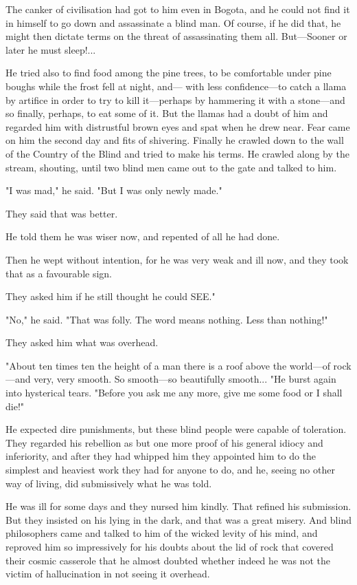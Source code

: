 \documentclass[courier]{sffms}
\begin{document}
The canker of civilisation had got to him even in Bogota, and he could
not find it in himself to go down and assassinate a blind man. Of
course, if he did that, he might then dictate terms on the threat of
assassinating them all. But---Sooner or later he must sleep!...

He tried also to find food among the pine trees, to be comfortable
under pine boughs while the frost fell at night, and--- with less
confidence---to catch a llama by artifice in order to try to kill
it---perhaps by hammering it with a stone---and so finally, perhaps, to
eat some of it. But the llamas had a doubt of him and regarded him
with distrustful brown eyes and spat when he drew near.  Fear came on
him the second day and fits of shivering. Finally he crawled down to
the wall of the Country of the Blind and tried to make his terms. He
crawled along by the stream, shouting, until two blind men came out to
the gate and talked to him.

"I was mad," he said. "But I was only newly made."

They said that was better.

He told them he was wiser now, and repented of all he had done.

Then he wept without intention, for he was very weak and ill now, and
they took that as a favourable sign.

They asked him if he still thought he could SEE."

"No," he said. "That was folly. The word means nothing. Less than
nothing!"

They asked him what was overhead.

"About ten times ten the height of a man there is a roof above the
world---of rock---and very, very smooth. So smooth---so beautifully
smooth...  "He burst again into hysterical tears. "Before you ask me
any more, give me some food or I shall die!"

He expected dire punishments, but these blind people were capable of
toleration.  They regarded his rebellion as but one more proof of his
general idiocy and inferiority, and after they had whipped him they
appointed him to do the simplest and heaviest work they had for anyone
to do, and he, seeing no other way of living, did submissively what he
was told.

He was ill for some days and they nursed him kindly. That refined his
submission. But they insisted on his lying in the dark, and that was a
great misery. And blind philosophers came and talked to him of the
wicked levity of his mind, and reproved him so impressively for his
doubts about the lid of rock that covered their cosmic casserole that
he almost doubted whether indeed he was not the victim of
hallucination in not seeing it overhead.
\end{document}
